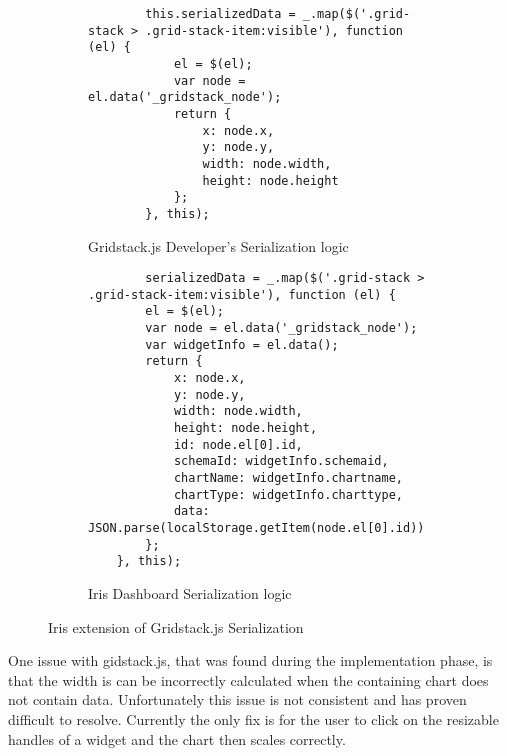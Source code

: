 \documentclass[12pt,a4paper,titlepage]{report}
\begin{document}
\begin{figure}[H]
\centering
\begin{tcolorbox}
    \begin{subfigure}{\textwidth}
        \begin{tcolorbox}
        \centering
        \begin{verbatim}
        this.serializedData = _.map($('.grid-stack > .grid-stack-item:visible'), function (el) {
            el = $(el);
            var node = el.data('_gridstack_node');
            return {
                x: node.x,
                y: node.y,
                width: node.width,
                height: node.height
            };
        }, this);
        \end{verbatim}
        \caption{Gridstack.js Developer's Serialization logic}\label{fig:Serialization_logic}
    \end{tcolorbox}
    \end{subfigure}%
    \newline
    \begin{subfigure}{\textwidth}
        \begin{tcolorbox}
        \centering
        \begin{verbatim}
        serializedData = _.map($('.grid-stack > .grid-stack-item:visible'), function (el) {
        el = $(el);
        var node = el.data('_gridstack_node');
        var widgetInfo = el.data();
        return {
            x: node.x,
            y: node.y,
            width: node.width,
            height: node.height,
            id: node.el[0].id,
            schemaId: widgetInfo.schemaid,
            chartName: widgetInfo.chartname,
            chartType: widgetInfo.charttype,
            data: JSON.parse(localStorage.getItem(node.el[0].id))
        };
    }, this);
        \end{verbatim}
        \caption{Iris Dashboard Serialization logic}
    \end{tcolorbox}
    \end{subfigure}

\end{tcolorbox}
\caption{Iris extension of Gridstack.js Serialization}
\end{figure}

One issue with gidstack.js, that was found during the implementation phase, is that the width is can be incorrectly calculated when the containing chart does not contain data. Unfortunately this issue is not consistent and has proven difficult to resolve. Currently the only fix is for the user to click on the resizable handles of a widget and the chart then scales correctly.
\end{document}

